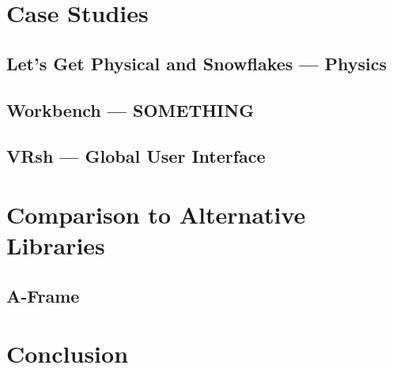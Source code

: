 \documentclass[conference,12pt]{IEEEtran}
\newcommand\name{VRsh}
\begin{document}

\section{Case Studies}

\subsection{Let's Get Physical and Snowflakes --- Physics}

\subsection{Workbench --- SOMETHING} %

\subsection{{\name} --- Global User Interface}

\section{Comparison to Alternative Libraries}

\subsection{A-Frame}

\section{Conclusion}

{\printbibliography}
\end{document}
